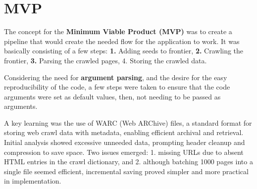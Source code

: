 

\section{MVP}

The concept for the \textbf{Minimum Viable Product (MVP)} was to create a pipeline that would create the needed flow for the application to work. It was basically consisting of a few steps: \textbf{1.} Adding seeds to frontier, \textbf{2.} Crawling the frontier, \textbf{3.} Parsing the crawled pages, 4. Storing the crawled data.

Considering the need for \textbf{argument parsing}, and the desire for the easy reproducibility of the code, a few steps were taken to ensure that the code arguments were set as default values, then, not needing to be passed as arguments.

A key learning was the use of WARC (Web ARChive) files, a standard format for storing web crawl data with metadata, enabling efficient archival and retrieval. Initial analysis showed excessive unneeded data, prompting header cleanup and compression to save space. Two issues emerged: 1. missing URLs due to absent HTML entries in the crawl dictionary, and 2. although batching 1000 pages into a single file seemed efficient, incremental saving proved simpler and more practical in implementation.

